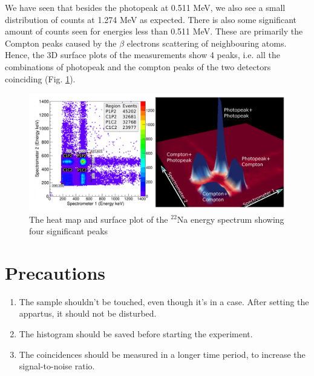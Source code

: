 We have seen that besides the photopeak at 0.511 MeV, we also see a small distribution of counts at 1.274 MeV as expected. There is also some significant amount of counts seen for energies less than 0.511 MeV. These are primarily the Compton peaks caused by the $\beta$ electrons scattering of neighbouring atoms. Hence, the 3D surface plots of the measurements show 4 peaks, i.e. all the combinations of photopeak and the compton peaks of the two detectors coinciding (Fig. \ref{3d}).

\begin{figure}[H]
    \centering
    \includegraphics[width=1\columnwidth]{images/3d.png}
    \caption{The heat map and surface plot of the $^{22}$Na energy spectrum showing four significant peaks \cite{manual}}
    \label{3d}
\end{figure}

\section{Precautions}

    \begin{enumerate}
        \item The sample shouldn’t be touched, even though it’s
        in a case. After setting the appartus, it should not
        be disturbed.
        \item The histogram should be saved before starting the
        experiment.
        \item The coincidences should be measured in a longer
        time period, to increase the signal-to-noise ratio.
    \end{enumerate}

